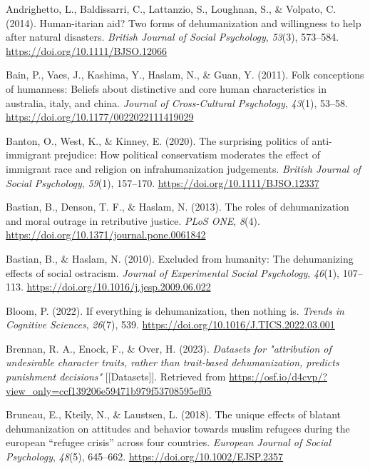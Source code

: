 \documentclass[
]{article}
\newlength{\cslhangindent}
\newlength{\cslentryspacingunit} %
\newenvironment{CSLReferences}[2] %
 {%
  \setlength{\parindent}{0pt}
  \ifodd #1
  \let\oldpar\par
  \def\par{\hangindent=\cslhangindent\oldpar}
  \fi
  \setlength{\parskip}{#2\cslentryspacingunit}
 }%
 {}
\begin{document}
\hypertarget{refs}{}
\begin{CSLReferences}{1}{0}
\leavevmode{}%
Andrighetto, L., Baldissarri, C., Lattanzio, S., Loughnan, S., \& Volpato, C. (2014). Human-itarian aid? Two forms of dehumanization and willingness to help after natural disasters. \emph{British Journal of Social Psychology}, \emph{53}(3), 573--584. \url{https://doi.org/10.1111/BJSO.12066}

\leavevmode{}%
Bain, P., Vaes, J., Kashima, Y., Haslam, N., \& Guan, Y. (2011). Folk conceptions of humanness: Beliefs about distinctive and core human characteristics in australia, italy, and china. \emph{Journal of Cross-Cultural Psychology}, \emph{43}(1), 53--58. \url{https://doi.org/10.1177/0022022111419029}

\leavevmode{}%
Banton, O., West, K., \& Kinney, E. (2020). The surprising politics of anti-immigrant prejudice: How political conservatism moderates the effect of immigrant race and religion on infrahumanization judgements. \emph{British Journal of Social Psychology}, \emph{59}(1), 157--170. \url{https://doi.org/10.1111/BJSO.12337}

\leavevmode{}%
Bastian, B., Denson, T. F., \& Haslam, N. (2013). The roles of dehumanization and moral outrage in retributive justice. \emph{PLoS ONE}, \emph{8}(4). \url{https://doi.org/10.1371/journal.pone.0061842}

\leavevmode{}%
Bastian, B., \& Haslam, N. (2010). Excluded from humanity: The dehumanizing effects of social ostracism. \emph{Journal of Experimental Social Psychology}, \emph{46}(1), 107--113. \url{https://doi.org/10.1016/j.jesp.2009.06.022}

\leavevmode{}%
Bloom, P. (2022). If everything is dehumanization, then nothing is. \emph{Trends in Cognitive Sciences}, \emph{26}(7), 539. \url{https://doi.org/10.1016/J.TICS.2022.03.001}

\leavevmode{}%
Brennan, R. A., Enock, F., \& Over, H. (2023). \emph{Datasets for "attribution of undesirable character traits, rather than trait-based dehumanization, predicts punishment decisions"} {[}{[}Datasets{]}{]}. Retrieved from \url{https://osf.io/d4cvp/?view_only=ccf139206e59471b979f53708595ef05}

\leavevmode{}%
Bruneau, E., Kteily, N., \& Laustsen, L. (2018). The unique effects of blatant dehumanization on attitudes and behavior towards muslim refugees during the european {``refugee crisis''} across four countries. \emph{European Journal of Social Psychology}, \emph{48}(5), 645--662. \url{https://doi.org/10.1002/EJSP.2357}


\end{CSLReferences}
\end{document}
